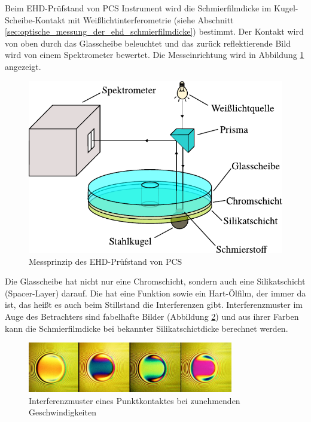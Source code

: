Beim EHD-Prüfstand von PCS Instrument wird die Schmierfilmdicke im Kugel-Scheibe-Kontakt mit Weißlichtinterferometrie (siehe Abschnitt \ref{sec:optische_messung_der_ehd_schmierfilmdicke}) bestimmt.
Der Kontakt wird von oben durch das Glasscheibe beleuchtet und das zurück reflektierende Bild wird von einem Spektrometer bewertet.
Die Messeinrichtung wird in Abbildung \ref{fig:ehl_messprinzip} angezeigt.
\begin{figure}[htb]
    \centering
    \includegraphics[]{./images/ehd_messprinzip.pdf}
    \caption{Messprinzip des EHD-Prüfstand von PCS \cite{mach_2008}}
    \label{fig:ehl_messprinzip}
\end{figure}
%

Die Glasscheibe hat nicht nur eine Chromschicht, sondern auch eine Silikatschicht (Spacer-Layer) darauf.
Die hat eine Funktion sowie ein Hart-Ölfilm, der immer da ist, das heißt es auch beim Stillstand die Interferenzen gibt.
Interferenzmuster im Auge des Betrachters sind fabelhafte Bilder (Abbildung \ref{fig:ehl_bilder}) und aus ihrer Farben kann die Schmierfilmdicke bei bekannter Silikatschictdicke berechnet werden.
\begin{figure}[htb]
    \centering
    \includegraphics[width=0.8\textwidth]{./images/ehl_contact_at_increasing_speeds.png}
    \caption{Interferenzmuster eines Punktkontaktes bei zunehmenden Geschwindigkeiten \cite{ehl_broshure}}
    \label{fig:ehl_bilder}
\end{figure}
%

